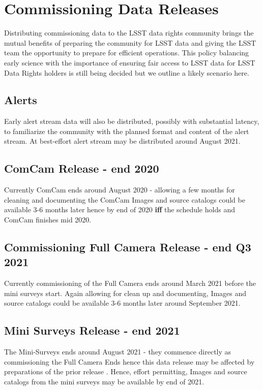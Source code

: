 \section{Commissioning Data Releases} \label{sect:commissioning}

Distributing commissioning data to the LSST data rights community brings the mutual benefits
of preparing the community for LSST data and giving the LSST team the opportunity to prepare
for efficient operations. This policy balancing
early science with the importance of ensuring fair access to LSST data for LSST Data Rights
holders is still being decided but we outline a likely scenario here.


\subsection{Alerts} \label{sect:alerts}
Early alert stream data will also be distributed, possibly with substantial latency, to
familiarize the community with the planned format and content of the alert stream.
At best-effort alert stream may be distributed around August 2021.


\subsection{ComCam Release - end 2020}
Currently ComCam ends  around August 2020 - allowing a few months for cleaning and documenting the
ComCam Images and source catalogs  could be available 3-6 months later hence by end of 2020 {\bf iff} the schedule holds and ComCam finishes mid 2020.

\subsection{Commissioning Full Camera  Release - end Q3 2021} \label{sect:cfc}
Currently commissioning of the Full Camera ends  around March 2021 before the mini surveys start.
Again allowing for clean up and documenting,  Images and source catalogs  could be available 3-6 months later around September 2021.

\subsection{Mini Surveys  Release - end 2021}
The Mini-Surveys ends  around August 2021 - they commence directly as commissioning the Full Camera Ends  hence this data release may be affected by preparations of the prior release .
Hence, effort permitting,  Images and source catalogs from the mini surveys may be available by end of 2021.
